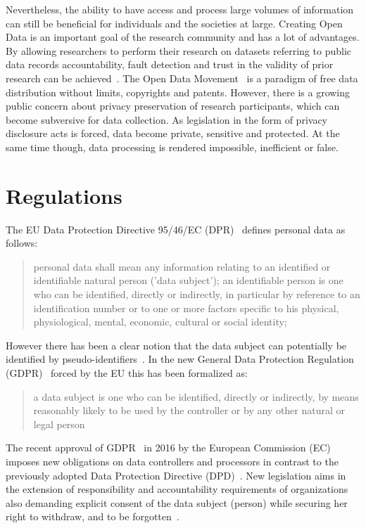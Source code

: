 \label{problem:sym:overview:open}

Nevertheless, the ability to have access and process large volumes of information can still be beneficial for individuals and the societies at large. Creating Open Data is an important goal of the research community and has a lot of advantages. By allowing researchers to perform their research on datasets referring to public data records accountability, fault detection and trust in the validity of prior research can be achieved~\cite{open_data_1}. The Open Data Movement~\cite{wiki:open_data} is a paradigm of free data distribution without limits, copyrights and patents. However, there is a growing public concern about privacy preservation of research participants, which can become subversive for data collection. As legislation in the form of privacy disclosure acts is forced, data become private, sensitive and protected. At the same time though, data processing is rendered impossible, inefficient or false.

\section{Regulations}\label{problem:regulations}

The EU Data Protection Directive 95/46/EC (DPR)~\cite{eu-46ec-1995} defines personal data as follows:
\blockquote{
personal data shall mean any information relating to an identified or identifiable natural person ('data subject'); an identifiable person is one who can be identified, directly or indirectly, in particular by reference to an identification number or to one or more factors specific to his physical, physiological, mental, economic, cultural or social identity;
}
However there has been a clear notion that the data subject can potentially be identified by pseudo-identifiers~\cite{pii}.
In the new General Data Protection Regulation (GDPR)~\cite{gdpr} forced by the EU this has been formalized as:
\blockquote{
a data subject is one who can be identified, directly or indirectly, by means reasonably likely to be used by the controller or by any other natural or legal person
}

The recent approval of GDPR~\cite{gdpr} in 2016 by the European Commission (EC)
imposes new obligations on data controllers and processors in contrast to the previously adopted Data Protection Directive (DPD)~\cite{eu-46ec-1995}.
New legislation aims in the extension of responsibility and accountability requirements of organizations also demanding explicit
consent of the data subject (person) while securing her right to withdraw, and to be forgotten~\cite{DBLP:journals/corr/NeisseSF17}.

